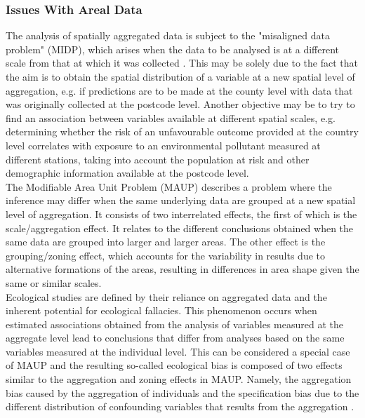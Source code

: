 \subsubsection{Issues With Areal Data}
The analysis of spatially aggregated data is subject to the "misaligned data problem" (MIDP), which arises when the data to be analysed is at a different scale from that at which it was collected \autocite[][]{banerjee2014hierarchical}. This may be solely due to the fact that the aim is to obtain the spatial distribution of a variable at a new spatial level of aggregation, e.g. if predictions are to be made at the county level with data that was originally collected at the postcode level. Another objective may be to try to find an association between variables available at different spatial scales, e.g. determining whether the risk of an unfavourable outcome provided at the country level correlates with exposure to an environmental pollutant measured at different stations, taking into account the population at risk and other demographic information available at the postcode level.\\
The Modifiable Area Unit Problem (MAUP) \autocite[][]{openshaw1984modifiable} describes a problem where the inference may differ when the same underlying data are grouped at a new spatial level of aggregation. It consists of two interrelated effects, the first of which is the scale/aggregation effect. It relates to the different conclusions obtained when the same data are grouped into larger and larger areas. The other effect is the grouping/zoning effect, which accounts for the variability in results due to alternative formations of the areas, resulting in differences in area shape given the same or similar scales. \\
Ecological studies are defined by their reliance on aggregated data \autocite[][]{robinson2009ecological} and the inherent potential for ecological fallacies. This phenomenon occurs when estimated associations obtained from the analysis of variables measured at the aggregate level lead to conclusions that differ from analyses based on the same variables measured at the individual level. This can be considered a special case of MAUP and the resulting so-called ecological bias is composed of two effects similar to the aggregation and zoning effects in MAUP. Namely, the aggregation bias caused by the aggregation of individuals and the specification bias due to the different distribution of confounding variables that results from the aggregation \autocite[][]{gotway2002combining, moraga2019geospatial}.
